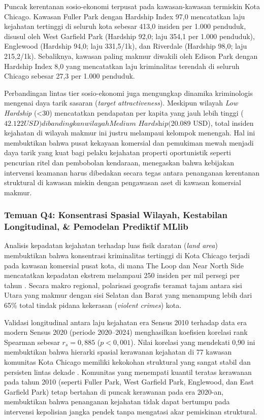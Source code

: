 \documentclass[11pt,a4paper]{article}
\begin{document}
Puncak kerentanan sosio-ekonomi terpusat pada kawasan-kawasan termiskin Kota Chicago. Kawasan Fuller Park dengan Hardship Index 97,0 mencatatkan laju kejahatan tertinggi di seluruh kota sebesar 413,0 insiden per 1.000 penduduk, disusul oleh West Garfield Park (Hardship 92,0; laju 354,1 per 1.000 penduduk), Englewood (Hardship 94,0; laju 331,5/1k), dan Riverdale (Hardship 98,0; laju 215,2/1k). Sebaliknya, kawasan paling makmur diwakili oleh Edison Park dengan Hardship Index 8,0 yang mencatatkan laju kriminalitas terendah di seluruh Chicago sebesar 27,3 per 1.000 penduduk.

Perbandingan lintas tier sosio-ekonomi juga mengungkap dinamika kriminologis mengenai daya tarik sasaran (\textit{target attractiveness}). Meskipun wilayah \textit{Low Hardship} (<30) mencatatkan pendapatan per kapita yang jauh lebih tinggi ($42.122 USD) dibandingkan wilayah \textit{Medium Hardship} ($20.089 USD), total insiden kejahatan di wilayah makmur ini justru melampaui kelompok menengah. Hal ini membuktikan bahwa pusat kekayaan komersial dan pemukiman mewah menjadi daya tarik yang kuat bagi pelaku kejahatan properti oportunistik seperti pencurian ritel dan pembobolan kendaraan, menegaskan bahwa kebijakan intervensi keamanan harus dibedakan secara tegas antara penanganan kerentanan struktural di kawasan miskin dengan pengawasan aset di kawasan komersial makmur.

\subsubsection{Temuan Q4: Konsentrasi Spasial Wilayah, Kestabilan Longitudinal, \& Pemodelan Prediktif MLlib}
Analisis kepadatan kejahatan terhadap luas fisik daratan (\textit{land area}) membuktikan bahwa konsentrasi kriminalitas tertinggi di Kota Chicago terjadi pada kawasan komersial pusat kota, di mana The Loop dan Near North Side mencatatkan kepadatan ekstrem melampaui 250 insiden per mil persegi per tahun \cite{stec2018}. Secara makro regional, polarisasi geografis teramat tajam antara sisi Utara yang makmur dengan sisi Selatan dan Barat yang menampung lebih dari 65\% total tindak pidana kekerasan (\textit{violent crimes}) kota.

Validasi longitudinal antara laju kejahatan era Sensus 2010 terhadap data era modern Sensus 2020 (periode 2020--2024) menghasilkan koefisien korelasi rank Spearman sebesar $r_s = 0,885$ ($p < 0,001$). Nilai korelasi yang mendekati 0,90 ini membuktikan bahwa hierarki spasial kerawanan kejahatan di 77 kawasan komunitas Kota Chicago memiliki kekokohan struktural yang sangat stabil dan persisten lintas dekade \cite{campedelli2020}. Komunitas yang menempati kuantil teratas kerawanan pada tahun 2010 (seperti Fuller Park, West Garfield Park, Englewood, dan East Garfield Park) tetap bertahan di puncak kerawanan pada era 2020-an, membuktikan bahwa penanganan kejahatan tidak dapat bertumpu pada intervensi kepolisian jangka pendek tanpa mengatasi akar pemiskinan struktural.
\end{document}
